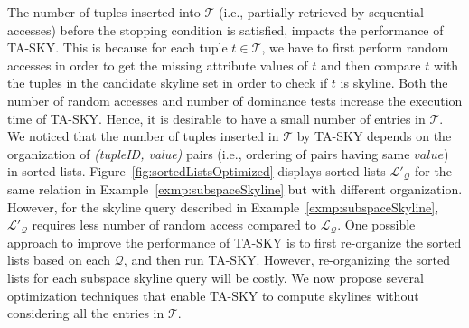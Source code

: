 The number of tuples inserted into $\mathcal{T}$ (i.e., partially retrieved by sequential accesses) before the stopping condition is satisfied, impacts the performance of TA-SKY. This is because for each tuple $t \in \mathcal{T}$, we have to first perform random accesses in order to get the missing attribute values of $t$ and then compare $t$ with the tuples in the candidate skyline set in order to check if $t$ is skyline. Both the number of random accesses and number of dominance tests increase the execution time of TA-SKY. Hence, it is desirable to have a small number of entries in $\mathcal{T}$.  We noticed that the number of tuples inserted in $\mathcal{T}$ by TA-SKY depends on the organization of \textit{(tupleID, value)} pairs (i.e., ordering of pairs having same $value$) in sorted lists. Figure~\ref{fig:sortedListsOptimized} displays sorted lists $\mathcal{L'_Q}$ for the same relation in Example~\ref{exmp:subspaceSkyline} but with different organization. 
However, for the skyline query described in Example~\ref{exmp:subspaceSkyline}, $\mathcal{L'_Q}$ requires less number of random access compared to $\mathcal{L_Q}$. One possible approach to improve the performance of TA-SKY is to first re-organize the sorted lists based on each $\mathcal{Q}$, and then run TA-SKY. However, re-organizing the sorted lists for each subspace skyline query will be costly. We now propose several optimization techniques that enable TA-SKY to compute skylines without considering all the entries in $\mathcal{T}$.



